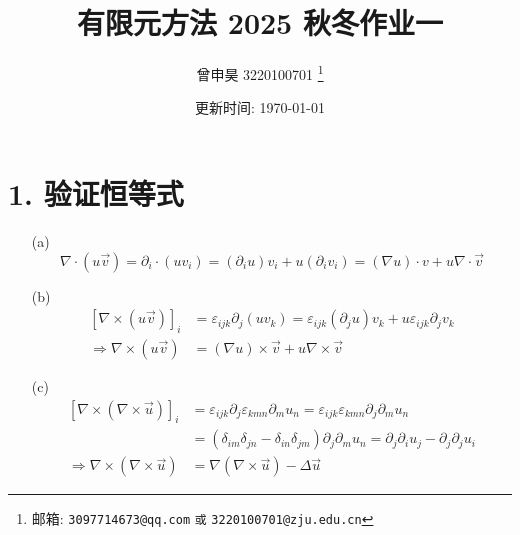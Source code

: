 \documentclass[a4paper]{article}
\begin{document}
\title{有限元方法 2025 秋冬作业一}

\author{曾申昊 3220100701
  \thanks{邮箱: \texttt{3097714673@qq.com}
                            \texttt{或} \texttt{3220100701@zju.edu.cn}}}


\date{更新时间: \today}

\maketitle


\section*{1. 验证恒等式}

\begin{enumerate}
    \item[(a)] 
    \begin{equation}
        \nabla \cdot (u\vec{v}) = \partial_i \cdot (u v_i)
                = (\partial_i u) v_i + u (\partial_i v_i)
                = (\nabla u) \cdot v + u \nabla \cdot \vec{v}
    \end{equation}
    \item[(b)] 
    \begin{equation}
        \begin{aligned}
            \left[\nabla \times (u\vec{v})\right]_i
        &=\varepsilon_{ijk}\partial_j (u v_k)
        =\varepsilon_{ijk}(\partial_j u) v_k + u \varepsilon_{ijk}\partial_j v_k\\
        \Rightarrow 
        \nabla \times (u\vec{v}) &= (\nabla u) \times \vec{v} + u \nabla \times \vec{v}
        \end{aligned}
    \end{equation}
    \item[(c)] 
    \begin{equation}
        \begin{aligned}
            \left[\nabla\times(\nabla\times\vec{u})\right]_i&=
        \varepsilon_{ijk}\partial_j\varepsilon_{kmn}\partial_m u_n
        =\varepsilon_{ijk}\varepsilon_{kmn}\partial_j\partial_m u_n\\
        &=(\delta_{im}\delta_{jn}-\delta_{in}\delta_{jm})\partial_j\partial_m u_n
        =\partial_j\partial_i u_j - \partial_j\partial_j u_i\\
        \Rightarrow 
        \nabla\times(\nabla\times\vec{u}) &= 
        \nabla(\nabla \times \vec{u}) - \Delta \vec{u}
        \end{aligned}
    \end{equation}
\end{enumerate}
\end{document}
